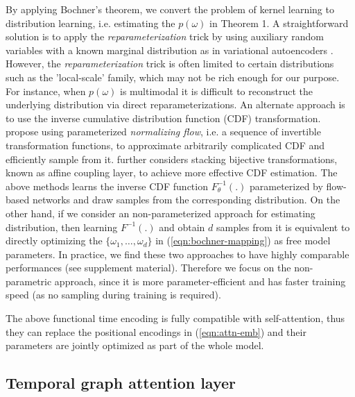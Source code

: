 \documentclass{article} %
\begin{document}
By applying Bochner's theorem, we convert the problem of kernel learning to distribution learning, i.e. estimating the $p(\omega)$ in Theorem 1. A straightforward solution is to apply the \textsl{reparameterization} trick by using auxiliary random variables with a known marginal distribution as in variational autoencoders \citep{kingma2013auto}. However, the \textsl{reparameterization} trick is often limited to certain distributions such as the 'local-scale' family, which may not be rich enough for our purpose. For instance, when $p(\omega)$ is multimodal it is difficult to reconstruct the underlying distribution via direct reparameterizations. An alternate approach is to use the inverse cumulative distribution function (CDF) transformation. \cite{rezende2015variational} propose using parameterized \textsl{normalizing flow}, i.e. a sequence of invertible transformation functions, to approximate arbitrarily complicated CDF and efficiently sample from it. \cite{dinh2016density} further considers stacking bijective transformations, known as affine coupling layer, to achieve more effective CDF estimation. The above methods learns the inverse CDF function $F^{-1}_{\theta}(.)$ parameterized by flow-based networks and draw samples from the corresponding distribution. 
On the other hand, if we consider an non-parameterized approach for estimating distribution, then learning $F^{-1}(.)$ and obtain $d$ samples from it is equivalent to directly optimizing the $\{\omega_1,\ldots,\omega_d\}$ in (\ref{eqn:bochner-mapping}) as free model parameters. 
In practice, we find these two approaches to have highly comparable performances (see supplement material). Therefore we focus on the non-parametric approach, since it is more parameter-efficient and has faster training speed (as no sampling during training is required). 

The above functional time encoding is fully compatible with self-attention, thus they can replace the positional encodings in (\ref{eqn:attn-emb}) and their parameters are jointly optimized as part of the whole model. 


\subsection{Temporal graph attention layer}
\label{sec:layer}
\end{document}

